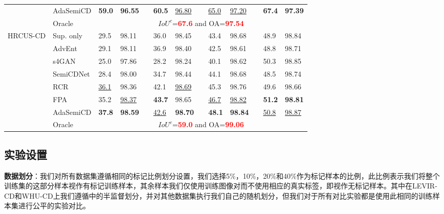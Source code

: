 \documentclass[lang=chs, degree=master, blindreview=false, adobe=false]{yanputhesis}
\begin{document}
\begin{table}[!htbp]
{\begin{tabular}{p{20mm}p{20mm}p{8mm}p{8mm}cp{8mm}p{8mm}cp{8mm}p{8mm}cp{8mm}p{8mm}}
      \rowcolor{mycyan}
      \multirow{-8}{*}{\cellcolor{white}}& \cellcolor{white}AdaSemiCD   &   \textbf{59.0} & \textbf{96.55} && \textbf{60.5} & \cellcolor{white}\underline{96.80} & \cellcolor{white} & \cellcolor{white}\underline{65.0} & \cellcolor{white}\underline{97.20} & \cellcolor{white}& \textbf{67.4} & \textbf{97.39} \\%
      \cline{2-13}
      & Oracle & \multicolumn{11}{c}{$ IoU^c$=\textcolor{red}{\bf 67.6} and OA=\textcolor{red}{\bf 97.54}} \\
      \bottomrule
      \multirow{8}{*}{HRCUS-CD}
      & Sup. only   &   29.5 & 98.11 && 36.0 & 98.45 && 43.4 & 98.68 && 48.9 & 98.84 \\ %
      & AdvEnt\cite{vu2019advent}& 29.1 & 98.11 && 36.9 & 98.40 && 42.5 & 98.61 && 48.8 & 98.71 \\ %
      & s4GAN\cite{mittal2019semi}& 25.0 & 97.86 && 28.2 & 98.24 && 40.1 & 98.62 && 50.3 & 98.85 \\
      & SemiCDNet\cite{peng2021SemiCDNet} & 28.4 & 98.00 && 34.7 & 98.44 && 44.1 & 98.68 && 48.5 & 98.74 \\ %
      & RCR\cite{bandara2022RCR}& \underline{36.1} & 98.36 && 42.1 & \underline{98.69} && 45.3 & 98.76 && 49.6 & 98.66 \\

      & FPA\cite{Zhang2023FPA}& 35.2 & \underline{98.37} && \cellcolor{mycyan}\textbf{43.7} & 98.65 && \underline{46.7} & \underline{98.82} && \cellcolor{mycyan}\textbf{51.2} & \textbf{98.81} \\

      \rowcolor{mycyan}
      \multirow{-8}{*}{\cellcolor{white}}& \cellcolor{white}AdaSemiCD   &  \textbf{37.8} & \cellcolor{mycyan}\textbf{98.59} && \cellcolor{white}\underline{42.6} & \textbf{98.70} && \textbf{48.1} & \textbf{98.84} && \cellcolor{white}\underline{50.8} & \underline{98.87} \\%
      \cline{2-13}
      & Oracle & \multicolumn{11}{c}{$ IoU^c$=\textcolor{red}{\bf 59.0} and OA=\textcolor{red}{\bf 99.06}} \\
      \bottomrule
  \end{tabular}
  }
  \label{tab:Ada-building}
\end{table}
\subsection{实验设置}
\textbf{数据划分}：我们对所有数据集遵循相同的标记比例划分设置，我们选择5$\%$，10$\%$，20$\%$和40$\%$作为标记样本的比例，此比例表示我们将整个训练集的这部分样本视作有标记训练样本，其余样本我们仅使用训练图像对而不使用相应的真实标签，即视作无标记样本。其中在LEVIR-CD和WHU-CD上我们遵循\cite{bandara2022RCR}\cite{Zhang2023FPA}中的半监督划分，并对其他数据集执行我们自己的随机划分，但我们对于所有对比实验都是使用此相同的训练样本集进行公平的实验对比。
\end{document}
